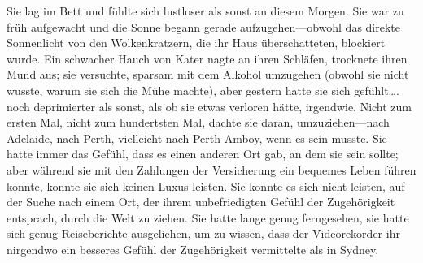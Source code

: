 Sie lag im Bett und fühlte sich lustloser als sonst an diesem Morgen. Sie war zu früh aufgewacht und die Sonne begann gerade aufzugehen—obwohl das direkte Sonnenlicht von den Wolkenkratzern, die ihr Haus überschatteten, blockiert wurde. Ein schwacher Hauch von Kater nagte an ihren Schläfen, trocknete ihren Mund aus; sie versuchte, sparsam mit dem Alkohol umzugehen (obwohl sie nicht wusste, warum sie sich die Mühe machte), aber gestern hatte sie sich gefühlt…. noch deprimierter als sonst, als ob sie etwas verloren hätte, irgendwie.
Nicht zum ersten Mal, nicht zum hundertsten Mal, dachte sie daran, umzuziehen—nach Adelaide, nach Perth, vielleicht nach Perth Amboy, wenn es sein musste. Sie hatte immer das Gefühl, dass es einen anderen Ort gab, an dem sie sein sollte; aber während sie mit den Zahlungen der Versicherung ein bequemes Leben führen konnte, konnte sie sich keinen Luxus leisten. Sie konnte es sich nicht leisten, auf der Suche nach einem Ort, der ihrem unbefriedigten Gefühl der Zugehörigkeit entsprach, durch die Welt zu ziehen. Sie hatte lange genug ferngesehen, sie hatte sich genug Reiseberichte ausgeliehen, um zu wissen, dass der Videorekorder ihr nirgendwo ein besseres Gefühl der Zugehörigkeit vermittelte als in Sydney.

